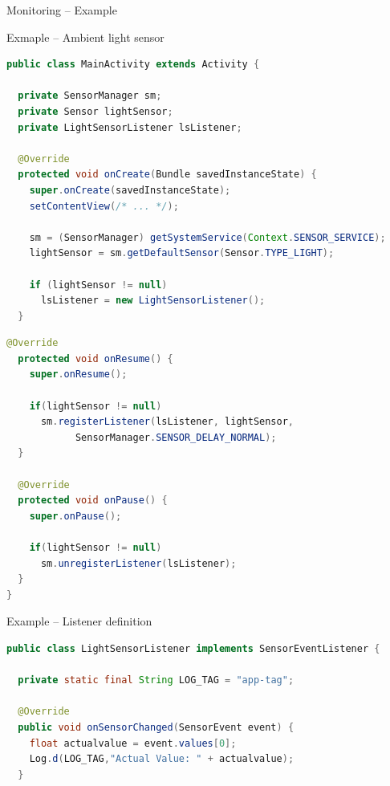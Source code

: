 \documentclass{beamer}
\begin{document}
  \begin{frame}{Monitoring -- Example}
    \begin{exampleblock}{Exmaple -- Ambient light sensor}
      \begin{lstlisting}[language=Java]  
public class MainActivity extends Activity {

  private SensorManager sm;
  private Sensor lightSensor;
  private LightSensorListener lsListener;

  @Override
  protected void onCreate(Bundle savedInstanceState) {
    super.onCreate(savedInstanceState);
    setContentView(/* ... */);

    sm = (SensorManager) getSystemService(Context.SENSOR_SERVICE);
    lightSensor = sm.getDefaultSensor(Sensor.TYPE_LIGHT);

    if (lightSensor != null)
      lsListener = new LightSensorListener();
  }      
      \end{lstlisting}
    \end{exampleblock}
    \begin{exampleblock}{\vspace{-10pt}}
      \begin{lstlisting}[language=Java] 
  @Override
  protected void onResume() {
    super.onResume();
    
    if(lightSensor != null)
      sm.registerListener(lsListener, lightSensor, 
            SensorManager.SENSOR_DELAY_NORMAL);
  }

  @Override
  protected void onPause() {
    super.onPause();
    
    if(lightSensor != null)
      sm.unregisterListener(lsListener);
  }
}
      \end{lstlisting}
    \end{exampleblock}

    \begin{exampleblock}{Example -- Listener definition}
      \begin{lstlisting}[language=Java]  
public class LightSensorListener implements SensorEventListener {

  private static final String LOG_TAG = "app-tag";
  
  @Override
  public void onSensorChanged(SensorEvent event) {
    float actualvalue = event.values[0];				
    Log.d(LOG_TAG,"Actual Value: " + actualvalue);
  }


\end{lstlisting}
\end{exampleblock}
\end{frame}
\end{document}
